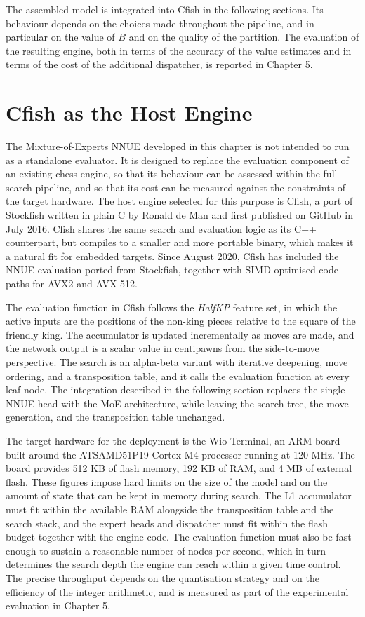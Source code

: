 The assembled model is integrated into Cfish in the following sections. Its behaviour depends on the choices made throughout the pipeline, and in particular on the value of $B$ and on the quality of the partition. The evaluation of the resulting engine, both in terms of the accuracy of the value estimates and in terms of the cost of the additional dispatcher, is reported in Chapter 5.

\section{Cfish as the Host Engine}

The Mixture-of-Experts NNUE developed in this chapter is not intended to run as a standalone evaluator. It is designed to replace the evaluation component of an existing chess engine, so that its behaviour can be assessed within the full search pipeline, and so that its cost can be measured against the constraints of the target hardware. The host engine selected for this purpose is Cfish, a port of Stockfish written in plain C by Ronald de Man and first published on GitHub in July 2016. Cfish shares the same search and evaluation logic as its C++ counterpart, but compiles to a smaller and more portable binary, which makes it a natural fit for embedded targets. Since August 2020, Cfish has included the NNUE evaluation ported from Stockfish, together with SIMD-optimised code paths for AVX2 and AVX-512.

The evaluation function in Cfish follows the \emph{HalfKP} feature set, in which the active inputs are the positions of the non-king pieces relative to the square of the friendly king. The accumulator is updated incrementally as moves are made, and the network output is a scalar value in centipawns from the side-to-move perspective. The search is an alpha-beta variant with iterative deepening, move ordering, and a transposition table, and it calls the evaluation function at every leaf node. The integration described in the following section replaces the single NNUE head with the MoE architecture, while leaving the search tree, the move generation, and the transposition table unchanged.

The target hardware for the deployment is the Wio Terminal, an ARM board built around the ATSAMD51P19 Cortex-M4 processor running at 120 MHz. The board provides 512 KB of flash memory, 192 KB of RAM, and 4 MB of external flash. These figures impose hard limits on the size of the model and on the amount of state that can be kept in memory during search. The L1 accumulator must fit within the available RAM alongside the transposition table and the search stack, and the expert heads and dispatcher must fit within the flash budget together with the engine code. The evaluation function must also be fast enough to sustain a reasonable number of nodes per second, which in turn determines the search depth the engine can reach within a given time control. The precise throughput depends on the quantisation strategy and on the efficiency of the integer arithmetic, and is measured as part of the experimental evaluation in Chapter 5.

